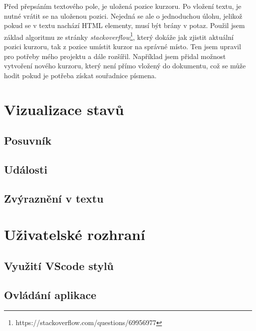 Před přepsáním textového pole, je uložená pozice kurzoru.
Po vložení textu, je nutné vrátit se na uloženou pozici. 
Nejedná se ale o jednoduchou úlohu, jelikož pokud se v textu nachází HTML elementy, musí být brány v potaz.
Použil jsem základ algoritmu ze stránky \textit{stackoverflow}\footnote{https://stackoverflow.com/questions/69956977}, který dokáže jak zjistit aktuální pozici kurzoru, tak z pozice umístit kurzor na správné místo.
Ten jsem upravil pro potřeby mého projektu a dále rozšířil.
Například jsem přidal možnost vytvoření nového kurzoru, který není přímo vložený do dokumentu, což se může hodit pokud je potřeba získat souřadnice písmena.


\section{Vizualizace stavů}

\subsection*{Posuvník}

\subsection*{Události}

\subsection*{Zvýraznění v textu}

\section{Uživatelské rozhraní}

\subsection*{Využití VScode stylů}

\subsection*{Ovládání aplikace}

\endinput